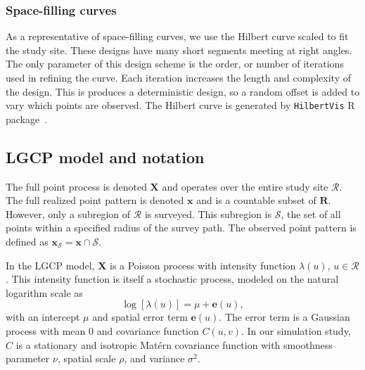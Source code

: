 \documentclass[review]{elsarticle}
\begin{document}
\subsubsection{Space-filling curves}

As a representative of space-filling curves, we use the Hilbert curve scaled
to fit the study site. These designs have many short segments meeting at right
angles. The only parameter of this design scheme is the order, or number of
iterations used in refining the curve. Each iteration increases the length and
complexity of the design. This is produces a deterministic design, so a random
offset is added to vary which points are observed. The Hilbert curve is
generated by \texttt{HilbertVis} R package~\citep{hilbertvis}.




\subsection{LGCP model and notation}

The full point process is denoted \(\mathbf{X}\) and operates over the entire
study site \(\mathcal{R}\). The full realized point pattern is denoted
\(\mathbf{x}\) and is a countable subset of \(\mathbf{R}\). However, only a
subregion of \(\mathcal{R}\) is surveyed. This subregion is \(\mathcal{S}\),
the set of all points within a specified radius of the survey path. The
observed point pattern is defined as \(\mathbf{x}_{\mathcal{S}} =
\mathbf{x} \cap \mathcal{S}\).

In the LGCP model, \(\mathbf{X}\) is a Poisson process with intensity
function \(\lambda(u)\), \(u \in \mathcal{R}\). This intensity function is
itself a stochastic process, modeled on the natural logarithm scale as
\begin{equation}
\log[\lambda(u)] = \mu + \mathbf{e}(u),
\end{equation}
with an intercept \(\mu\) and spatial error term \(\mathbf{e}(u)\). The error
term is a Gaussian process with mean 0 and covariance function \(C(u, v)\).
In our simulation study, \(C\) is a stationary and isotropic Mat\'{e}rn
covariance function with smoothness parameter \(\nu\), spatial scale \(\rho\),
and variance \(\sigma^{2}\).
\end{document}
